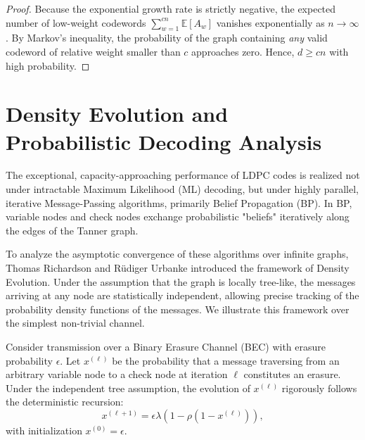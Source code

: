 \begin{proof}
Because the exponential growth rate is strictly negative, the expected number of low-weight codewords $\sum_{w=1}^{cn} \mathbb{E}[A_w]$ vanishes exponentially as $n \to \infty$. By Markov's inequality, the probability of the graph containing \textit{any} valid codeword of relative weight smaller than $c$ approaches zero. Hence, $d \ge c n$ with high probability.
\end{proof}

\section{Density Evolution and Probabilistic Decoding Analysis}

The exceptional, capacity-approaching performance of LDPC codes is realized not under intractable Maximum Likelihood (ML) decoding, but under highly parallel, iterative Message-Passing algorithms, primarily Belief Propagation (BP). In BP, variable nodes and check nodes exchange probabilistic "beliefs" iteratively along the edges of the Tanner graph. 

To analyze the asymptotic convergence of these algorithms over infinite graphs, Thomas Richardson and Rüdiger Urbanke introduced the framework of Density Evolution. Under the assumption that the graph is locally tree-like, the messages arriving at any node are statistically independent, allowing precise tracking of the probability density functions of the messages. We illustrate this framework over the simplest non-trivial channel.

\begin{theorem}
\label{thm:density_evolution}
Consider transmission over a Binary Erasure Channel (BEC) with erasure probability $\epsilon$. Let $x^{(\ell)}$ be the probability that a message traversing from an arbitrary variable node to a check node at iteration $\ell$ constitutes an erasure. Under the independent tree assumption, the evolution of $x^{(\ell)}$ rigorously follows the deterministic recursion:
\[
x^{(\ell+1)} = \epsilon \lambda\left( 1 - \rho(1 - x^{(\ell)}) \right),
\]
with initialization $x^{(0)} = \epsilon$.
\end{theorem}

